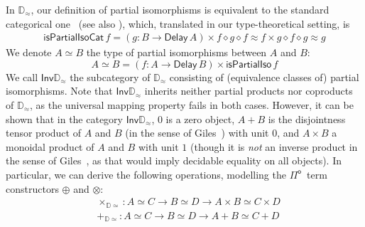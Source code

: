 \documentclass[runningheads,a4paper]{llncs}
\newcommand{\Pio}{\ensuremath{\mathsf{\Pi}^{\mathsf{o}}}}
\newcommand{\Inv}{\mathsf{Inv}}
\newcommand{\Delay}{\ensuremath{\mathsf{Delay}\,}}
\newcommand{\D}{\mathbb{D}}
\newcommand{\Dapprox}{\mathbb{D}_{\approx}}
\newcommand{\piso}{\mathsf{isPartialIso}}
\newcommand{\pisoalt}{\mathsf{isPartialIsoCat}}
\begin{document}
In $\Dapprox$, our definition of partial isomorphisms is equivalent to
the standard categorical one~\cite{Kastl79} (see also \cite{CockettL02}),
which, translated in our type-theoretical setting, is
\begin{align*}
\pisoalt \,f = (g : B \to \Delay A) \times f \diamond g \diamond
  f \approx f \times g \diamond f \diamond g \approx g 
\end{align*}
We denote $A \simeq B$ the type of partial isomorphisms between
$A$ and $B$:
\[
A \simeq B = (f : A \to \Delay B) \times \piso \,f
\]
We call $\Inv \Dapprox$ the subcategory of $\Dapprox$ consisting of
(equivalence classes of) partial isomorphisms. Note that
$\Inv\Dapprox$ inherits neither partial products nor coproducts of
$\Dapprox$, as the universal mapping property fails in both
cases. However, it can be shown that in the category $\Inv\Dapprox$,
$0$ is a zero object, $A + B$ is the disjointness tensor product of
$A$ and $B$ (in the sense of Giles~\cite{Giles}) with unit $0$, and
$A \times B$ a monoidal product of $A$ and $B$ with unit $1$ (though
it is \emph{not} an inverse product in the sense of
Giles~\cite{Giles}, as that would imply decidable equality on all
objects).  In particular, we can derive the following operations,
modelling the \Pio\ term constructors $\oplus$ and $\otimes$:
\begin{align*}
& \times_{\D \simeq} : A \simeq C \to B \simeq D \to A \times B
  \simeq C \times D \\
& +_{\D \simeq} : A \simeq C \to B \simeq D \to A + B
  \simeq C + D
\end{align*}





\end{document}
